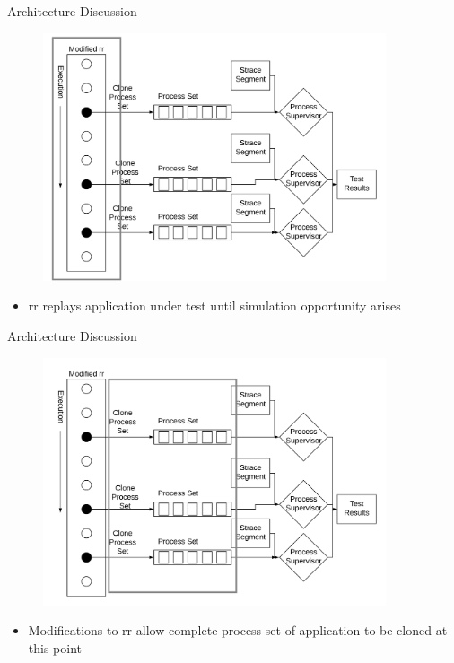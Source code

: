 \documentclass[pdf]{beamer}
\begin{document}
\begin{frame}{Architecture Discussion}
  \begin{figure}
    \centering
    \includegraphics[width = 0.9\textwidth]{images/architecture_replay}
  \end{figure}
  \begin{itemize}
    \item{rr replays application under test until simulation opportunity
      arises}
  \end{itemize}
\end{frame}


\begin{frame}{Architecture Discussion}
  \begin{figure}
    \centering
    \includegraphics[width = 0.9\textwidth]{images/architecture_process_sets}
  \end{figure}
  \begin{itemize}
    \item{Modifications to rr allow complete process set of application to
      be cloned at this point}
  \end{itemize}
\end{frame}
\end{document}
